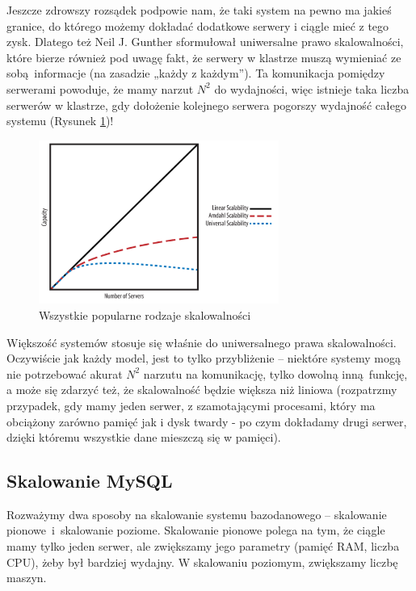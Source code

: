 \documentclass[a4paper,12pt]{article}
\begin{document}
Jeszcze zdrowszy rozsądek podpowie nam, że taki system na pewno ma jakieś granice, do którego możemy dokładać dodatkowe serwery i ciągle mieć z tego zysk. Dlatego też Neil J. Gunther sformułował uniwersalne prawo skalowalności, które bierze również pod uwagę fakt, że serwery w klastrze muszą wymieniać ze sobą informacje (na zasadzie „każdy z każdym”). Ta komunikacja pomiędzy serwerami powoduje, że mamy narzut $N^2$ do wydajności, więc istnieje taka liczba serwerów w klastrze, gdy dołożenie kolejnego serwera pogorszy wydajność całego systemu (Rysunek \ref{fig:scaling-all})!

\begin{figure}[ht]
\centering
\includegraphics[width=0.7\textwidth]{scaling-all.png}
\caption{Wszystkie popularne rodzaje skalowalności}
\label{fig:scaling-all}
\end{figure}


Większość systemów stosuje się właśnie do uniwersalnego prawa skalowalności. Oczywiście jak każdy model, jest to tylko przybliżenie – niektóre systemy mogą nie potrzebować akurat $N^2$ narzutu na komunikację, tylko dowolną inną funkcję, a może się zdarzyć też, że skalowalność będzie większa niż liniowa (rozpatrzmy przypadek, gdy mamy jeden serwer, z szamotającymi procesami, który ma obciążony zarówno pamięć jak i dysk twardy - po czym dokładamy drugi serwer, dzięki któremu wszystkie dane mieszczą się w pamięci).

\subsection{Skalowanie MySQL}

Rozważymy dwa sposoby na skalowanie systemu bazodanowego – skalowanie pionowe~i~skalowanie poziome. Skalowanie pionowe polega na tym, że ciągle mamy tylko jeden serwer, ale zwiększamy jego parametry (pamięć RAM, liczba CPU), żeby był bardziej wydajny. W skalowaniu poziomym, zwiększamy liczbę maszyn.
\end{document}
